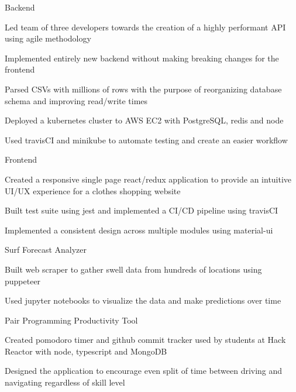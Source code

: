 
\begin{cventries}
  \cventry
    {} %
    {Backend} %
    {} %
    {} %
    {
      \begin{cvitems} %
        \item {Led team of three developers towards the creation of a highly performant API using agile methodology}
        \item {Implemented entirely new backend without making breaking changes for the frontend}
		\item {Parsed CSVs with millions of rows with the purpose of reorganizing database schema and improving read/write times}
		\item {Deployed a kubernetes cluster to AWS EC2 with PostgreSQL, redis and node}
		\item {Used travisCI and minikube to automate testing and create an easier workflow}
      \end{cvitems}
    }
  
  \cventry
    {} %
    {Frontend} %
    {} %
    {} %
    {
      \begin{cvitems} %
		\item {Created a responsive single page react/redux application to provide an intuitive UI/UX experience for a clothes shopping website}
		\item {Built test suite using jest and implemented a CI/CD pipeline using travisCI}
		\item {Implemented a consistent design across multiple modules using material-ui}
      \end{cvitems}
    }

  \cventry
    {} %
    {Surf Forecast Analyzer} %
    {} %
    {} %
    {
      \begin{cvitems} %
      	\item {Built web scraper to gather swell data from hundreds of locations using puppeteer}
		\item {Used jupyter notebooks to visualize the data and make predictions over time}
      \end{cvitems}
    }
    
  \cventry
    {} %
    {Pair Programming Productivity Tool} %
    {} %
    {} %
    {
      \begin{cvitems} %
      	\item {Created pomodoro timer and github commit tracker used by students at Hack Reactor with node, typescript and MongoDB}
      	\item {Designed the application to encourage even split of time between driving and navigating regardless of skill level}
      \end{cvitems}
    }
\end{cventries}